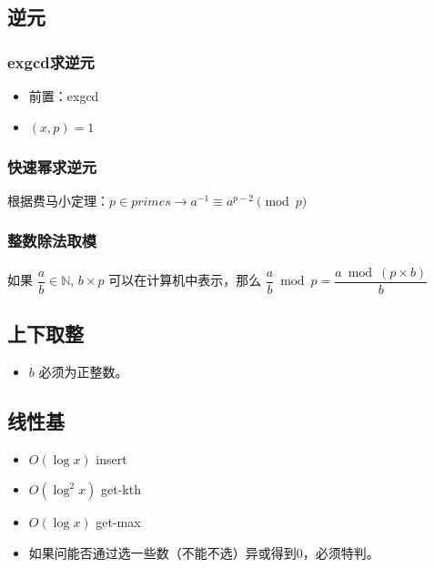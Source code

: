 \subsection{逆元}

\subsubsection{exgcd求逆元}
\begin{itemize}
    \item 前置：exgcd
    \item $(x,p)=1$
\end{itemize}


\subsubsection{快速幂求逆元}

根据费马小定理：$p\in primes\to a^{-1}\equiv a^{p - 2}\pmod{p}$

\subsubsection{整数除法取模}
如果 $\dfrac{a}{b}\in \mathbb{N}$, $b\times p$ 可以在计算机中表示，那么 $\dfrac{a}{b}\bmod p=\dfrac{a\bmod(p\times b)}{b}$
\subsection{上下取整}
\begin{itemize}
    \item $b$ 必须为正整数。
\end{itemize}

\subsection{线性基}
\begin{itemize}
    \item $O(\log x)$ insert
    \item $O(\log^2 x)$ get-kth
    \item $O(\log x)$ get-max
    \item 如果问能否通过选一些数（不能不选）异或得到0，必须特判。
\end{itemize}

